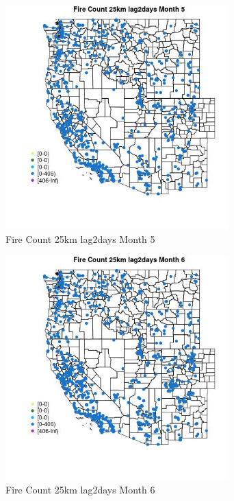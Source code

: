 \begin{figure} 
\centering  
\includegraphics[width=0.77\textwidth]{Code_Outputs/Report_ML_input_PM25_Step4_part_f_de_duplicated_aveswNAs_MapObsMo5Fire_Count_25km_lag2days.jpg} 
\caption{\label{fig:Report_ML_input_PM25_Step4_part_f_de_duplicated_aveswNAsMapObsMo5Fire_Count_25km_lag2days}Fire Count 25km lag2days Month 5} 
\end{figure} 
 

\begin{figure} 
\centering  
\includegraphics[width=0.77\textwidth]{Code_Outputs/Report_ML_input_PM25_Step4_part_f_de_duplicated_aveswNAs_MapObsMo6Fire_Count_25km_lag2days.jpg} 
\caption{\label{fig:Report_ML_input_PM25_Step4_part_f_de_duplicated_aveswNAsMapObsMo6Fire_Count_25km_lag2days}Fire Count 25km lag2days Month 6} 
\end{figure} 
 

